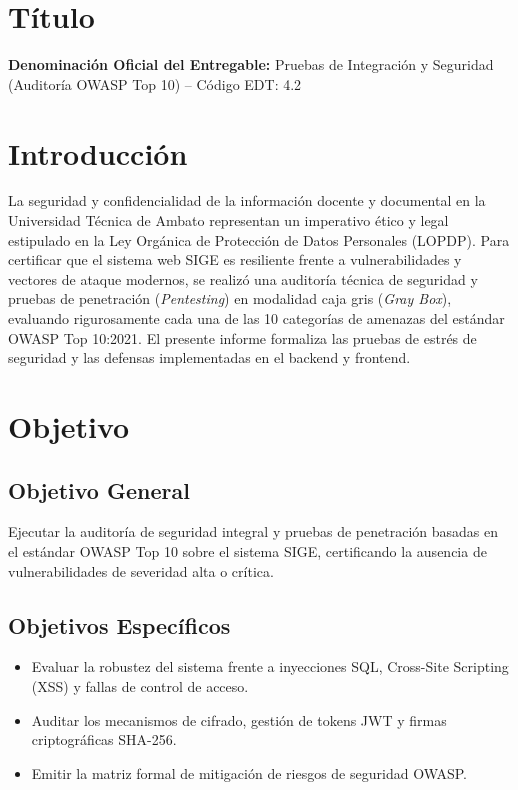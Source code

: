 \documentclass[12pt,a4paper]{article}
\begin{document}
\section{Título}
\textbf{Denominación Oficial del Entregable:} Pruebas de Integración y Seguridad (Auditoría OWASP Top 10) -- Código EDT: 4.2

\section{Introducción}
La seguridad y confidencialidad de la información docente y documental en la Universidad Técnica de Ambato representan un imperativo ético y legal estipulado en la Ley Orgánica de Protección de Datos Personales (LOPDP). Para certificar que el sistema web SIGE es resiliente frente a vulnerabilidades y vectores de ataque modernos, se realizó una auditoría técnica de seguridad y pruebas de penetración (\textit{Pentesting}) en modalidad caja gris (\textit{Gray Box}), evaluando rigurosamente cada una de las 10 categorías de amenazas del estándar OWASP Top 10:2021. El presente informe formaliza las pruebas de estrés de seguridad y las defensas implementadas en el backend y frontend.

\section{Objetivo}
\subsection{Objetivo General}
Ejecutar la auditoría de seguridad integral y pruebas de penetración basadas en el estándar OWASP Top 10 sobre el sistema SIGE, certificando la ausencia de vulnerabilidades de severidad alta o crítica.
\subsection{Objetivos Específicos}
\begin{itemize}[leftmargin=1.5em, itemsep=2pt]
    \item Evaluar la robustez del sistema frente a inyecciones SQL, Cross-Site Scripting (XSS) y fallas de control de acceso.
    \item Auditar los mecanismos de cifrado, gestión de tokens JWT y firmas criptográficas SHA-256.
    \item Emitir la matriz formal de mitigación de riesgos de seguridad OWASP.
\end{itemize}
\end{document}

